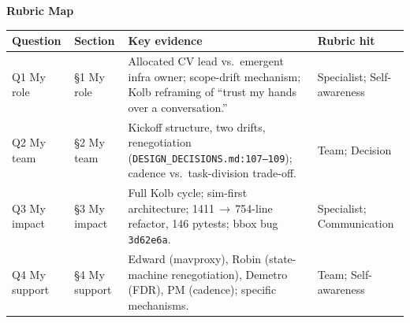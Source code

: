 \documentclass[11pt,a4paper]{article}
\begin{document}


\begin{center}
{\large\bfseries Rubric Map}
\end{center}
\vspace{-0.4em}
\begin{tabularx}{\textwidth}{@{}l l X l@{}}
\toprule
\textbf{Question} & \textbf{Section} & \textbf{Key evidence} & \textbf{Rubric hit} \\
\midrule
Q1 My role       & \S1 My role    & Allocated CV lead vs.\ emergent infra owner; scope-drift mechanism; Kolb reframing of ``trust my hands over a conversation.'' & Specialist; Self-awareness \\
Q2 My team       & \S2 My team    & Kickoff structure, two drifts, renegotiation (\texttt{DESIGN\_DECISIONS.md:107--109}); cadence vs.\ task-division trade-off. & Team; Decision \\
Q3 My impact     & \S3 My impact  & Full Kolb cycle; sim-first architecture; 1411\,$\to$\,754-line refactor, 146 pytests; bbox bug \texttt{3d62e6a}. & Specialist; Communication \\
Q4 My support    & \S4 My support & Edward (mavproxy), Robin (state-machine renegotiation), Demetro (FDR), PM (cadence); specific mechanisms. & Team; Self-awareness \\
\bottomrule
\end{tabularx}

\vspace{0.6em}





\end{document}
